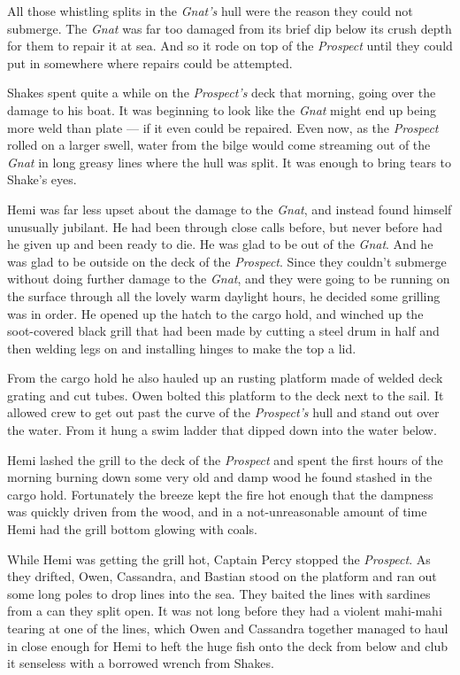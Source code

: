 \documentclass[]{scrbook}
\begin{document}
All those whistling splits in the \emph{Gnat's} hull were the reason
they could not submerge. The \emph{Gnat} was far too damaged from its
brief dip below its crush depth for them to repair it at sea. And so it
rode on top of the \emph{Prospect} until they could put in somewhere
where repairs could be attempted.

Shakes spent quite a while on the \emph{Prospect's} deck that morning,
going over the damage to his boat. It was beginning to look like the
\emph{Gnat} might end up being more weld than plate --- if it even could
be repaired. Even now, as the \emph{Prospect} rolled on a larger swell,
water from the bilge would come streaming out of the \emph{Gnat} in long
greasy lines where the hull was split. It was enough to bring tears to
Shake's eyes.

Hemi was far less upset about the damage to the \emph{Gnat}, and instead
found himself unusually jubilant. He had been through close calls
before, but never before had he given up and been ready to die. He was
glad to be out of the \emph{Gnat}. And he was glad to be outside on the
deck of the \emph{Prospect}. Since they couldn't submerge without doing
further damage to the \emph{Gnat}, and they were going to be running on
the surface through all the lovely warm daylight hours, he decided some
grilling was in order. He opened up the hatch to the cargo hold, and
winched up the soot-covered black grill that had been made by cutting a
steel drum in half and then welding legs on and installing hinges to
make the top a lid.

From the cargo hold he also hauled up an rusting platform made of welded
deck grating and cut tubes. Owen bolted this platform to the deck next
to the sail. It allowed crew to get out past the curve of the
\emph{Prospect's} hull and stand out over the water. From it hung a swim
ladder that dipped down into the water below.

Hemi lashed the grill to the deck of the \emph{Prospect} and spent the
first hours of the morning burning down some very old and damp wood he
found stashed in the cargo hold. Fortunately the breeze kept the fire
hot enough that the dampness was quickly driven from the wood, and in a
not-unreasonable amount of time Hemi had the grill bottom glowing with
coals.

While Hemi was getting the grill hot, Captain Percy stopped the
\emph{Prospect}. As they drifted, Owen, Cassandra, and Bastian stood on
the platform and ran out some long poles to drop lines into the sea.
They baited the lines with sardines from a can they split open. It was
not long before they had a violent mahi-mahi tearing at one of the
lines, which Owen and Cassandra together managed to haul in close enough
for Hemi to heft the huge fish onto the deck from below and club it
senseless with a borrowed wrench from Shakes.
\end{document}
